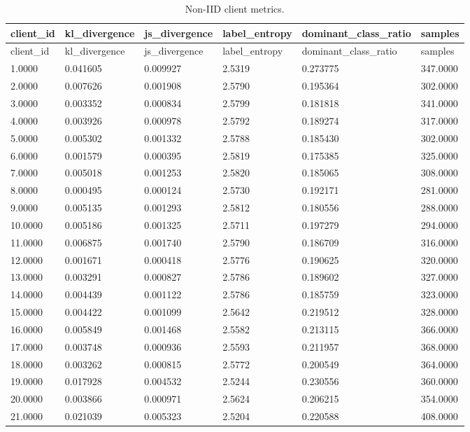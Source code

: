 \documentclass[11pt]{report}
\begin{document}
\begin{longtable}{llllll}
\caption{Non-IID client metrics.}\\
\toprule
client\_id & kl\_divergence & js\_divergence & label\_entropy & dominant\_class\_ratio & samples \\
\midrule
\endfirsthead
\toprule
client\_id & kl\_divergence & js\_divergence & label\_entropy & dominant\_class\_ratio & samples \\
\midrule
\endhead
1.0000 & 0.041605 & 0.009927 & 2.5319 & 0.273775 & 347.0000 \\
2.0000 & 0.007626 & 0.001908 & 2.5790 & 0.195364 & 302.0000 \\
3.0000 & 0.003352 & 0.000834 & 2.5799 & 0.181818 & 341.0000 \\
4.0000 & 0.003926 & 0.000978 & 2.5792 & 0.189274 & 317.0000 \\
5.0000 & 0.005302 & 0.001332 & 2.5788 & 0.185430 & 302.0000 \\
6.0000 & 0.001579 & 0.000395 & 2.5819 & 0.175385 & 325.0000 \\
7.0000 & 0.005018 & 0.001253 & 2.5820 & 0.185065 & 308.0000 \\
8.0000 & 0.000495 & 0.000124 & 2.5730 & 0.192171 & 281.0000 \\
9.0000 & 0.005135 & 0.001293 & 2.5812 & 0.180556 & 288.0000 \\
10.0000 & 0.005186 & 0.001325 & 2.5711 & 0.197279 & 294.0000 \\
11.0000 & 0.006875 & 0.001740 & 2.5790 & 0.186709 & 316.0000 \\
12.0000 & 0.001671 & 0.000418 & 2.5776 & 0.190625 & 320.0000 \\
13.0000 & 0.003291 & 0.000827 & 2.5786 & 0.189602 & 327.0000 \\
14.0000 & 0.004439 & 0.001122 & 2.5786 & 0.185759 & 323.0000 \\
15.0000 & 0.004422 & 0.001099 & 2.5642 & 0.219512 & 328.0000 \\
16.0000 & 0.005849 & 0.001468 & 2.5582 & 0.213115 & 366.0000 \\
17.0000 & 0.003748 & 0.000936 & 2.5593 & 0.211957 & 368.0000 \\
18.0000 & 0.003262 & 0.000815 & 2.5772 & 0.200549 & 364.0000 \\
19.0000 & 0.017928 & 0.004532 & 2.5244 & 0.230556 & 360.0000 \\
20.0000 & 0.003866 & 0.000971 & 2.5624 & 0.206215 & 354.0000 \\
21.0000 & 0.021039 & 0.005323 & 2.5204 & 0.220588 & 408.0000 \\

\end{longtable}
\end{document}
